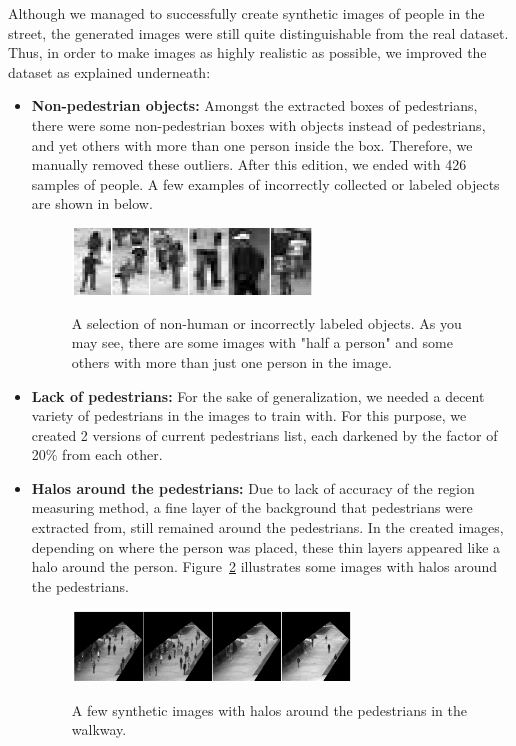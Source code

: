 Although we managed to successfully create synthetic images of people in the street, the generated images were still quite distinguishable from the real dataset. Thus, in order to make images as highly realistic as possible, we improved the dataset as explained underneath:
\begin{itemize}
\item \textbf{Non-pedestrian objects:} Amongst the extracted boxes of pedestrians, there were some non-pedestrian boxes with objects instead of pedestrians, and yet others with more than one person inside the box. Therefore, we manually removed these outliers. After this edition, we ended with 426 samples of people. A few examples of incorrectly collected or labeled objects are shown in below.

\begin{figure}[H]
	\centering
	{\includegraphics[width=0.6\textwidth]{images/nonped}}
	\caption{A selection of non-human or incorrectly labeled objects. As you may see, there are some images with "half a person" and some others with more than just one person in the image.}
	\label{fig:nonped}
\end{figure}
 
\item \textbf{Lack of pedestrians:} For the sake of generalization, we needed a decent variety of pedestrians in the images to train with. For this purpose, we created 2 versions of current pedestrians list, each darkened by the factor of 20\% from each other. 
\item \textbf{Halos around the pedestrians:} Due to lack of accuracy of the region measuring method, a fine layer of the background that pedestrians were extracted from, still remained around the pedestrians. In the created images, depending on where the person was placed, these thin layers appeared like a halo around the person. Figure~\ref{fig:haloim} illustrates some images with halos around the pedestrians. 
\begin{figure}[H]
	\centering
	{\includegraphics[width=0.7\textwidth]{images/halo}}
	\caption{A few synthetic images with halos around the pedestrians in the walkway.}
	\label{fig:haloim}
\end{figure}
 

\end{itemize}
